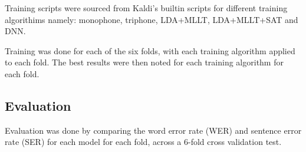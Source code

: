 Training scripts were sourced from Kaldi's builtin scripts for different training algorithims namely: monophone, triphone, LDA+MLLT, LDA+MLLT+SAT and DNN.

Training was done for each of the six folds, with each training algorithm applied to each fold. The best results were then noted for each training algorithm for each fold.




\subsection{Evaluation}

Evaluation was done by comparing the word error rate (WER) and sentence error rate (SER) for each model for each fold, across a 6-fold cross validation test.

